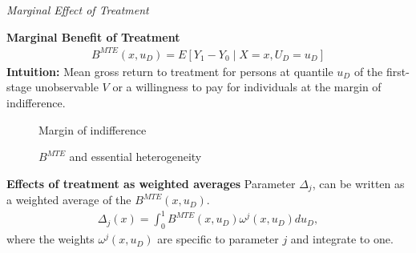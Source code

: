\begin{frame}\begin{center}
		\LARGE\textit{Marginal Effect of Treatment}
\end{center}\end{frame}
\begin{frame}\textbf{Marginal Benefit of Treatment}
	\begin{align*}
		B^{MTE}(x, u_D) = E [Y_1 - Y_0 \mid X = x,  U_D = u_D]
	\end{align*}
	\textbf{Intuition:} Mean gross return to treatment for persons at
	quantile \(u_D\) of the first-stage unobservable \(V\) or a willingness to pay for individuals at the margin of indifference.
\end{frame}
\begin{frame}
	\begin{figure}\caption{Margin of indifference}
	\end{figure}
\end{frame}
\begin{frame}
\begin{figure}\caption{$B^{MTE}$ and essential heterogeneity}
	\end{figure}
\end{frame}
\begin{frame}
	\textbf{Effects of treatment as weighted averages}
	Parameter \(\Delta_j\), can be written as a weighted average of the
	\(B^{MTE}(x, u_D)\).
	\begin{align*}
		\Delta_j(x) = \int_0^1 B^{MTE}(x, u_D) \omega^j(x, u_D) du_D,
	\end{align*}
	where the weights \(\omega^j(x, u_D)\) are specific to parameter \(j\)
	and integrate to one.
\end{frame}
